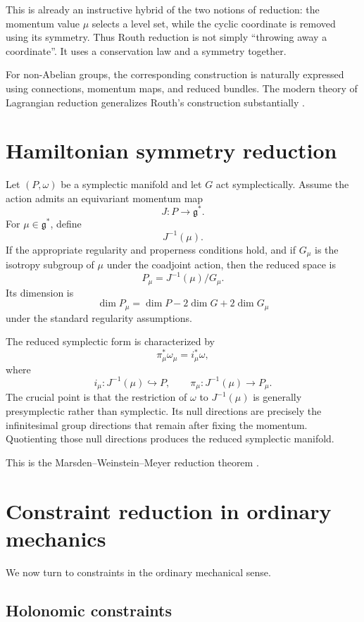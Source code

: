 \documentclass[11pt,a4paper]{article}
\newcommand{\g}{\mathfrak g}
\theoremstyle{definition}
\begin{document}
This is already an instructive hybrid of the two notions of reduction:
the momentum value $\mu$ selects a level set, while the cyclic coordinate is
removed using its symmetry.  Thus Routh reduction is not simply ``throwing
away a coordinate''.  It uses a conservation law and a symmetry together.

For non-Abelian groups, the corresponding construction is naturally expressed
using connections, momentum maps, and reduced bundles.  The modern theory of
Lagrangian reduction generalizes Routh's construction substantially
\cite{MarsdenRatiuScheurle2007,CendraMarsdenRatiu2001}.

\section{Hamiltonian symmetry reduction}

Let $(P,\omega)$ be a symplectic manifold and let $G$ act symplectically.
Assume the action admits an equivariant momentum map
\[
        J:P\to\g^*.
\]
For $\mu\in\g^*$, define
\[
        J^{-1}(\mu).
\]
If the appropriate regularity and properness conditions hold, and if
$G_\mu$ is the isotropy subgroup of $\mu$ under the coadjoint action, then
the reduced space is
\[
        P_\mu
        =
        J^{-1}(\mu)/G_\mu.
\]
Its dimension is
\[
        \dim P_\mu
        =
        \dim P-2\dim G+2\dim G_\mu
\]
under the standard regularity assumptions.

The reduced symplectic form is characterized by
\[
        \pi_\mu^*\omega_\mu
        =
        i_\mu^*\omega,
\]
where
\[
        i_\mu:J^{-1}(\mu)\hookrightarrow P,
        \qquad
        \pi_\mu:J^{-1}(\mu)\to P_\mu.
\]
The crucial point is that the restriction of $\omega$ to
$J^{-1}(\mu)$ is generally presymplectic rather than symplectic.  Its null
directions are precisely the infinitesimal group directions that remain after
fixing the momentum.  Quotienting those null directions produces the reduced
symplectic manifold.

This is the Marsden--Weinstein--Meyer reduction theorem
\cite{MarsdenWeinstein1974,Meyer1973}.

\section{Constraint reduction in ordinary mechanics}

We now turn to constraints in the ordinary mechanical sense.

\subsection{Holonomic constraints}
\end{document}
